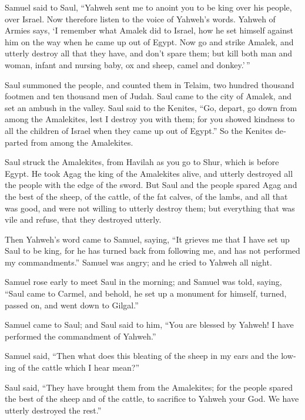 \begin{paracol}{2}
\begin{otherlanguage}{english}
 Samuel said to Saul, ``Yahweh sent me to anoint you to be
king over his people, over Israel. Now therefore listen to the voice of
Yahweh's words.  Yahweh of Armies says, `I remember what
Amalek did to Israel, how he set himself against him on the way when he
came up out of Egypt.  Now go and strike Amalek, and
utterly destroy all that they have, and don't spare them; but kill both
man and woman, infant and nursing baby, ox and sheep, camel and
donkey.'\,''

 Saul summoned the people, and counted them in Telaim, two
hundred thousand footmen and ten thousand men of Judah. 
Saul came to the city of Amalek, and set an ambush in the valley.
 Saul said to the Kenites, ``Go, depart, go down from
among the Amalekites, lest I destroy you with them; for you showed
kindness to all the children of Israel when they came up out of Egypt.''
So the Kenites departed from among the Amalekites.

 Saul struck the Amalekites, from Havilah as you go to
Shur, which is before Egypt.  He took Agag the king of the
Amalekites alive, and utterly destroyed all the people with the edge of
the sword.  But Saul and the people spared Agag and the
best of the sheep, of the cattle, of the fat calves, of the lambs, and
all that was good, and were not willing to utterly destroy them; but
everything that was vile and refuse, that they destroyed utterly.

 Then Yahweh's word came to Samuel, saying,
 ``It grieves me that I have set up Saul to be king, for
he has turned back from following me, and has not performed my
commandments.'' Samuel was angry; and he cried to Yahweh all night.

 Samuel rose early to meet Saul in the morning; and
Samuel was told, saying, ``Saul came to Carmel, and behold, he set up a
monument for himself, turned, passed on, and went down to Gilgal.''

 Samuel came to Saul; and Saul said to him, ``You are
blessed by Yahweh! I have performed the commandment of Yahweh.''

 Samuel said, ``Then what does this bleating of the sheep
in my ears and the lowing of the cattle which I hear mean?''

 Saul said, ``They have brought them from the Amalekites;
for the people spared the best of the sheep and of the cattle, to
sacrifice to Yahweh your God. We have utterly destroyed the rest.''


\end{otherlanguage}
\end{paracol}
